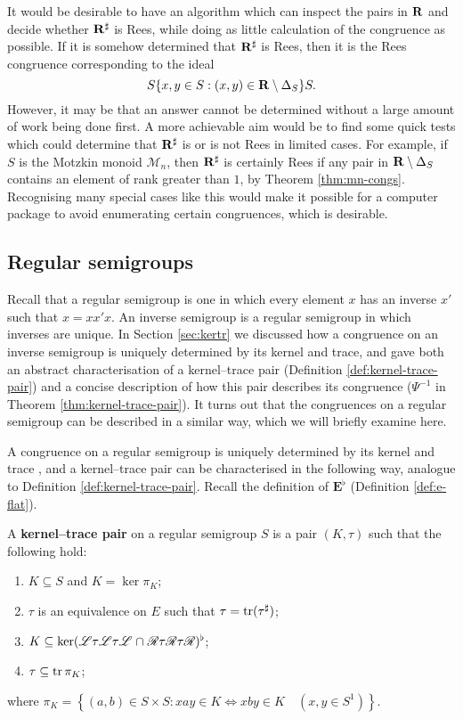 It would be desirable to have an algorithm which can inspect the pairs in $\mathbf{R}$
and decide whether $\mathbf{R}^\sharp$ is Rees, while doing as little calculation of the
congruence as possible.  If it is somehow determined that $\mathbf{R}^\sharp$ is Rees, then it
is the Rees congruence corresponding to the ideal
$$S\{x,y \in S : (x,y) \in \mathbf{R} \setminus \Delta_S\}S.$$
However, it may be that an answer cannot be determined without a large amount of
work being done first.  A more achievable aim would be to find some quick tests
which could determine that $\mathbf{R}^\sharp$ is or is not Rees in limited cases.  For
example, if $S$ is the Motzkin monoid $\mathcal{M}_n$, then $\mathbf{R}^\sharp$ is certainly
Rees if any pair in $\mathbf{R} \setminus \Delta_S$ contains an element of rank greater
than $1$, by Theorem \ref{thm:mn-congs}.  Recognising many special cases
like this would make it possible for a computer package to avoid enumerating
certain congruences, which is desirable.

\subsection{Regular semigroups}
\label{sec:converting-regular}
Recall that a regular semigroup  is one in which every element $x$ has an inverse
$x'$ such that $x = xx'x$.  An inverse semigroup is a regular semigroup in which
inverses are unique.  In Section \ref{sec:kertr} we discussed how a congruence
on an inverse semigroup is uniquely determined by its kernel and trace, and gave
both an abstract characterisation of a kernel--trace pair (Definition
\ref{def:kernel-trace-pair}) and a concise description of how this pair
describes its congruence ($\Psi^{-1}$ in Theorem \ref{thm:kernel-trace-pair}).
It turns out that the congruences on a regular semigroup can be described in a
similar way, which we will briefly examine here.

A congruence on a regular semigroup is uniquely determined by its kernel and
trace \cite[Corollary 2.11]{pastijn_1986}, and a kernel--trace pair can be
characterised in the following way, analogue to Definition
\ref{def:kernel-trace-pair}.  Recall the definition of $\mathbf{E}^\flat$
(Definition \ref{def:e-flat}).

\begin{definition}
  \label{def:regular-kernel-trace-pair}
  A \textbf{kernel--trace pair} on a regular semigroup $S$ is a pair $(K,\tau)$
  such that the following hold:
  \begin{enumerate}[\rm(1)]
  \item $K \subseteq S$ and $K = \ker \pi_K$;
  \item $\tau$ is an equivalence on $E$ such that $\tau = \operatorname{tr}(\tau^\sharp)$;
  \item
    $K \subseteq \ker(\mathrel{\mathscr{L}}\mathrel{\tau}\mathrel{\mathscr{L}}\mathrel{\tau}\mathrel{\mathscr{L}} \cap
    \mathrel{\mathscr{R}}\mathrel{\tau}\mathrel{\mathscr{R}}\mathrel{\tau}\mathrel{\mathscr{R}})^\flat$;
  \item $\tau \subseteq \operatorname{tr} \pi_K$;
  \end{enumerate}
  where
  $\pi_K = \left\{(a,b) \in S \times S : xay \in K \Leftrightarrow xby \in K
    \quad (x,y \in S^1)\right\}$.
\end{definition}

